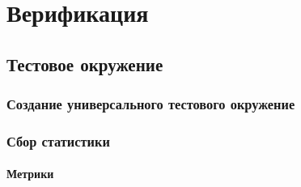
\chapter{Верификация}

\section{Тестовое окружение}

\subsection{Создание универсального тестового окружение}

\subsection{Сбор статистики}

\subsubsection{Метрики}

\clearpage

